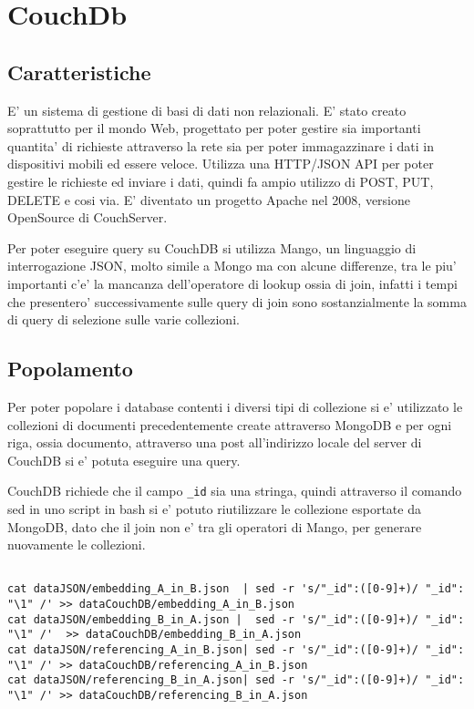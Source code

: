 \chapter{CouchDb}

\section{Caratteristiche}

E' un sistema di gestione di basi di dati non relazionali. E' stato creato soprattutto per il mondo Web, progettato per poter gestire sia importanti quantita' di richieste attraverso
la rete sia per poter immagazzinare i dati in dispositivi mobili ed essere veloce. Utilizza una HTTP/JSON API per poter gestire le richieste ed inviare i dati, quindi
fa ampio utilizzo di POST, PUT, DELETE e cosi via. E' diventato un progetto Apache nel 2008, versione OpenSource di CouchServer.

Per poter eseguire query su CouchDB si utilizza Mango, un linguaggio di interrogazione JSON, molto simile a Mongo ma con alcune differenze, tra le piu'
importanti c'e' la mancanza dell'operatore di lookup ossia di join, infatti i tempi che presentero' successivamente sulle query di join sono 
sostanzialmente la somma di query di selezione sulle varie collezioni.
\section{Popolamento}

Per poter popolare i database contenti i diversi tipi di collezione si e' utilizzato le collezioni di documenti precedentemente create attraverso MongoDB e per ogni 
riga, ossia documento, attraverso una post all'indirizzo locale del server di CouchDB si e' potuta eseguire una query.

CouchDB richiede che il campo \verb|_id| sia una stringa, quindi attraverso il comando sed in uno script in bash si e' potuto riutilizzare le collezione esportate
da MongoDB, dato che il join non e' tra gli operatori di Mango, per generare nuovamente le collezioni.

\begin{Verbatim}

cat dataJSON/embedding_A_in_B.json  | sed -r 's/"_id":([0-9]+)/ "_id": "\1" /' >> dataCouchDB/embedding_A_in_B.json
cat dataJSON/embedding_B_in_A.json |  sed -r 's/"_id":([0-9]+)/ "_id": "\1" /'  >> dataCouchDB/embedding_B_in_A.json
cat dataJSON/referencing_A_in_B.json| sed -r 's/"_id":([0-9]+)/ "_id": "\1" /' >> dataCouchDB/referencing_A_in_B.json
cat dataJSON/referencing_B_in_A.json| sed -r 's/"_id":([0-9]+)/ "_id": "\1" /' >> dataCouchDB/referencing_B_in_A.json

\end{Verbatim}

